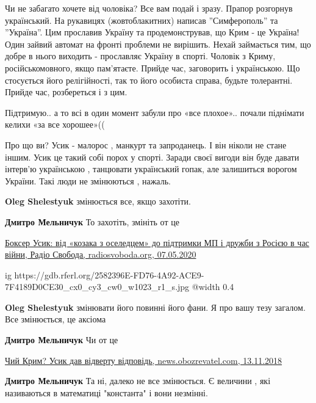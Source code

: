 \begin{itemize}

\obeycr
Чи не забагато хочете від чоловіка? Все вам подай і зразу.
Прапор розгорнув український. На рукавицях (жовтоблакитних) написав ''Симферополь'' та ''Україна''.
Цим прославив Україну та продемонстрував, що Крим - це Україна!
Один зайвий автомат на фронті проблеми не вирішить. Нехай займається тим, що добре в нього виходить - прославляє Україну в спорті.
Чоловік з Криму, російськомовного, якщо пам'ятаєте. Прийде час, заговорить і українською.
Що стосується його релігійності, так то його особиста справа, будьте толерантні. Прийде час, розбереться і з цим.
\restorecr


Підтримую.. а то всі в один момент забули про «все плохое».. почали піднімати
келихи «за все хорошее»((

Про що ви?
Усик - малорос , манкурт та запроданець.
І він ніколи не стане іншим.
Усик це такий собі порох у спорті.
Заради своєї вигоди він буде давати інтерв'ю українською , танцювати український гопак, але залишиться ворогом України.
Такі люди не змінюються , нажаль.

\begin{itemize} %
\textbf{Oleg Shelestyuk} змінюється все, якщо захотіти.

\textbf{Дмитро Мельничук}
То захотіть, змініть от це

\href{https://www.radiosvoboda.org/a/oleksandr-usyk-i-rosija/30597900.html}{%
Боксер Усик: від «козака з оселедцем» до підтримки МП і дружби з Росією в час війни, %
Радіо Свобода, radiosvoboda.org, 07.05.2020%
}

\ifcmt
  ig https://gdb.rferl.org/2582396E-FD76-4A92-ACE9-7F4189D0CE30_cx0_cy3_cw0_w1023_r1_s.jpg
  @width 0.4
\fi

\textbf{Oleg Shelestyuk} змінювати його повинні його фани.
Я про вашу тезу загалом.
Все змінюється, це аксіома

\textbf{Дмитро Мельничук}
Чи от це

\href{https://news.obozrevatel.com/ukr/sport/box/chij-krim-usik-dav-vidvertu-vidpovid.htm}{%
Чий Крим? Усик дав відверту відповідь, news.obozrevatel.com, 13.11.2018%
}

\textbf{Дмитро Мельничук}
Та ні, далеко не все змінюється. Є величини , які називаються в математиці "константа" і вони незмінні.


\end{itemize}
\end{itemize}

